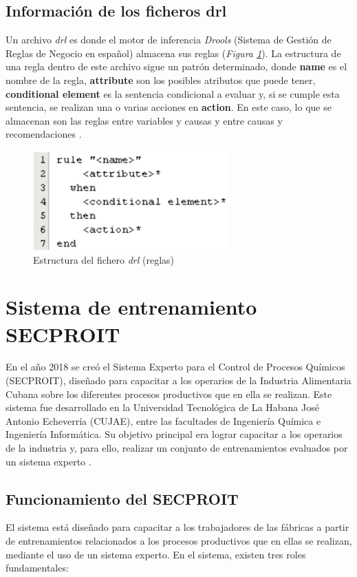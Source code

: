 \subsection{Información de los ficheros drl}
Un archivo \textsl{drl} es donde el motor de inferencia \textsl{Drools} (Sistema de Gestión de Reglas de Negocio en español) almacena sus reglas (\textsl{Figura \ref{fig:reglas}}). La estructura de una regla dentro de este archivo sigue un patrón determinado, donde \textbf{name} es el nombre de la regla, \textbf{attribute} son los posibles atributos que puede tener, \textbf{conditional element} es la sentencia condicional a evaluar y, si se cumple esta sentencia, se realizan una o varias acciones en \textbf{action}. En este caso, lo que se almacenan son  las reglas entre variables y causas y entre causas y recomendaciones \cite{Riveron2017}.

\begin{figure}[h]
\centering
 \includegraphics[width=0.47\linewidth]{imagen/rules.png}
 \caption{Estructura del fichero \textsl{drl} (reglas)}
 \label{fig:reglas} 
\end{figure}

\section{Sistema de entrenamiento SECPROIT}
En el año 2018 se creó el Sistema Experto para el Control de Procesos Químicos (SECPROIT), diseñado para capacitar a los operarios de la Industria Alimentaria Cubana sobre los diferentes procesos productivos que en ella se realizan. Este sistema fue desarrollado en la Universidad Tecnológica de La Habana José Antonio Echeverría (CUJAE), entre las facultades de Ingeniería Química e Ingeniería Informática. Su objetivo principal era lograr capacitar a los operarios de la industria y, para ello, realizar un conjunto de entrenamientos evaluados por un sistema experto \cite{ElenaAcostaGil2018}.

\subsection{Funcionamiento del SECPROIT}
El sistema está diseñado para capacitar a los trabajadores de las fábricas a partir de entrenamientos relacionados a los procesos productivos que en ellas se realizan, mediante el uso de un sistema experto. En el sistema, existen tres roles fundamentales: 


